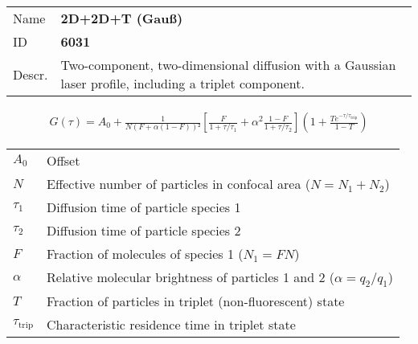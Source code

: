 \noindent \begin{tabular}{lp{}}
Name & \textbf{2D+2D+T (Gauß)} \\ 
ID & \textbf{6031} \\ 
Descr. &  Two-component, two-dimensional diffusion with a Gaussian laser profile, including a triplet component. \\ 
\end{tabular}
\begin{align}
G(\tau) = A_0 + \frac{1}{N (F + \alpha (1-F))²} \left[ \frac{F}{1+\tau/\tau_1} + \alpha^2 \frac{1-F}{ 1+\tau/\tau_2 } \right] \left(1 + \frac{T e^{-\tau/\tau_\mathrm{trip}}}{1-T}  \right) 
\end{align} 
\begin{center}
\begin{tabular}{ll}
$A_0$ & Offset \\ 
$N$ & Effective number of particles in confocal area ($N = N_1+N_2$) \\ 
$\tau_1$ &  Diffusion time of particle species 1 \\ 
$\tau_2$ &  Diffusion time of particle species 2 \\ 
$F$ & Fraction of molecules of species 1 ($N_1 = F N$) \\
$\alpha$ & Relative molecular brightness of particles 1 and 2 ($ \alpha = q_2/q_1$) \\
$T$ &  Fraction of particles in triplet (non-fluorescent) state\\ 
$\tau_\mathrm{trip}$ &  Characteristic residence time in triplet state \\ 
\end{tabular}
\end{center}
\vspace{2em}


